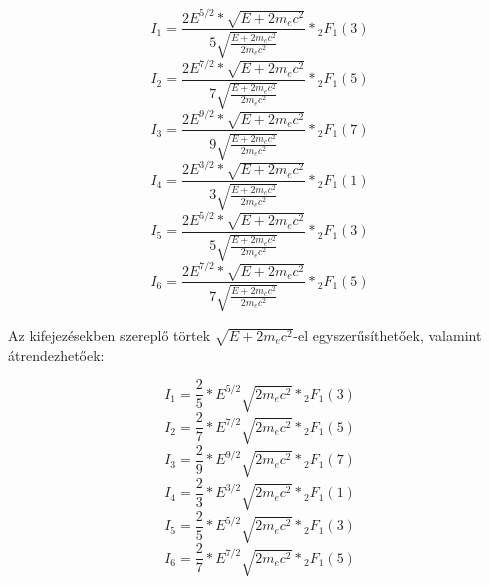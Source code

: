 \begin{multicols}{2}
\begin{equation}\label{eq:49}
I_{1}
=
\frac{2 E^{5/2} * \sqrt{E + 2m_{e}c^{2}}}{5 \sqrt{\frac{E + 2m_{e}c^{2}}{2m_{e}c^{2}}}} * {}_2F_{1} \left( 3 \right)
\end{equation}
\begin{equation}\label{eq:50}
I_{2}
=
\frac{2 E^{7/2} * \sqrt{E + 2m_{e}c^{2}}}{7 \sqrt{\frac{E + 2m_{e}c^{2}}{2m_{e}c^{2}}}} * {}_2F_{1} \left( 5 \right)
\end{equation}
\begin{equation}\label{eq:51}
I_{3}
=
\frac{2 E^{9/2} * \sqrt{E + 2m_{e}c^{2}}}{9 \sqrt{\frac{E + 2m_{e}c^{2}}{2m_{e}c^{2}}}} * {}_2F_{1} \left( 7 \right)
\end{equation}
\begin{equation}\label{eq:52}
I_{4}
=
\frac{2 E^{3/2} * \sqrt{E + 2m_{e}c^{2}}}{3 \sqrt{\frac{E + 2m_{e}c^{2}}{2m_{e}c^{2}}}} * {}_2F_{1} \left( 1 \right)
\end{equation}
\begin{equation}\label{eq:53}
I_{5}
=
\frac{2 E^{5/2} * \sqrt{E + 2m_{e}c^{2}}}{5 \sqrt{\frac{E + 2m_{e}c^{2}}{2m_{e}c^{2}}}} * {}_2F_{1} \left( 3 \right)
\end{equation}
\begin{equation}\label{eq:54}
I_{6}
=
\frac{2 E^{7/2} * \sqrt{E + 2m_{e}c^{2}}}{7 \sqrt{\frac{E + 2m_{e}c^{2}}{2m_{e}c^{2}}}} * {}_2F_{1} \left( 5 \right)
\end{equation}
\end{multicols}
Az kifejezésekben szereplő törtek $\sqrt{E + 2m_{e}c^{2}}$-el egyszerűsíthetőek, valamint átrendezhetőek:

\begin{multicols}{2}
\begin{equation}\label{eq:55}
I_{1}
=
\frac{2}{5} * E^{5/2} \sqrt{2m_{e}c^{2}} * {}_2F_{1} \left( 3 \right)
\end{equation}
\begin{equation}\label{eq:56}
I_{2}
=
\frac{2}{7} * E^{7/2} \sqrt{2m_{e}c^{2}} * {}_2F_{1} \left( 5 \right)
\end{equation}
\begin{equation}\label{eq:57}
I_{3}
=
\frac{2}{9} * E^{9/2} \sqrt{2m_{e}c^{2}} * {}_2F_{1} \left( 7 \right)
\end{equation}
\begin{equation}\label{eq:58}
I_{4}
=
\frac{2}{3} * E^{3/2} \sqrt{2m_{e}c^{2}} * {}_2F_{1} \left( 1 \right)
\end{equation}
\begin{equation}\label{eq:59}
I_{5}
=
\frac{2}{5} * E^{5/2} \sqrt{2m_{e}c^{2}} * {}_2F_{1} \left( 3 \right)
\end{equation}
\begin{equation}\label{eq:60}
I_{6}
=
\frac{2}{7} * E^{7/2} \sqrt{2m_{e}c^{2}} * {}_2F_{1} \left( 5 \right)
\end{equation}
\end{multicols}

